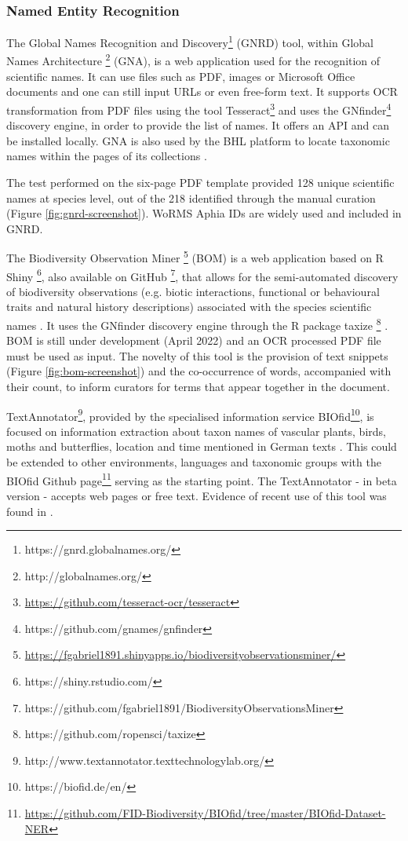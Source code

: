    \subsubsection{Named Entity Recognition}
   The Global Names Recognition and Discovery\footnote{https://gnrd.globalnames.org/}
(GNRD) tool, within Global Names Architecture
\footnote{http://globalnames.org/} (GNA), is a web application used for the
recognition of scientific names. It can use files such as PDF, images or
Microsoft Office documents and one can still input URLs or even free-form text.
It supports OCR transformation from PDF files using the tool
Tesseract\footnote{\url{https://github.com/tesseract-ocr/tesseract}} and uses
the GNfinder\footnote{https://github.com/gnames/gnfinder} discovery engine, in
order to provide the list of names. It offers an API and can be installed
locally. GNA is also used by the BHL platform to locate taxonomic names within
the pages of its collections \cite{richard_improving_2020}.

The test performed on the \cite{WoRMS:SourceID:40714} six-page PDF template
provided 128 unique scientific names at species level, out of the 218
identified through the manual curation
(Figure \ref{fig:gnrd-screenshot}). WoRMS Aphia IDs
\cite{vandepitte_fishing_2015,martin_miguez_european_2019} are widely used and
included in GNRD.

The Biodiversity Observation Miner \footnote{\url{https://fgabriel1891.shinyapps.io/biodiversityobservationsminer/}}
(BOM) is a web application based on R Shiny \footnote{https://shiny.rstudio.com/},
also available on GitHub \footnote{https://github.com/fgabriel1891/BiodiversityObservationsMiner},
that allows for the semi-automated discovery of biodiversity observations (e.g.
biotic interactions, functional or behavioural traits and natural history
descriptions) associated with the species scientific names \cite{10.3897/BDJ.7.e28737}.
It uses the GNfinder discovery engine through the R package
taxize \footnote{https://github.com/ropensci/taxize} \cite{chamberlain_taxize_2013}.
BOM is still under development (April 2022) and an OCR processed PDF file must
be used as input. The novelty of this tool is the provision of text snippets
(Figure \ref{fig:bom-screenshot}) and the co-occurrence of words, accompanied
with their count, to inform curators for terms that appear together in the
document.

TextAnnotator\footnote{http://www.textannotator.texttechnologylab.org/},
provided by the specialised information service BIOfid\footnote{https://biofid.de/en/},
is focused on information extraction about taxon names of vascular plants,
birds, moths and butterflies, location and time mentioned in German texts
\cite{driller_workflow_2018,driller_fast_2020}. This could be extended to
other environments, languages and taxonomic groups with the BIOfid Github
page\footnote{\url{https://github.com/FID-Biodiversity/BIOfid/tree/master/BIOfid-Dataset-NER}}
serving as the starting point. The TextAnnotator - in beta version - accepts
web pages or free text. Evidence of recent use of this tool was found in \cite{driller_fast_2020}.

